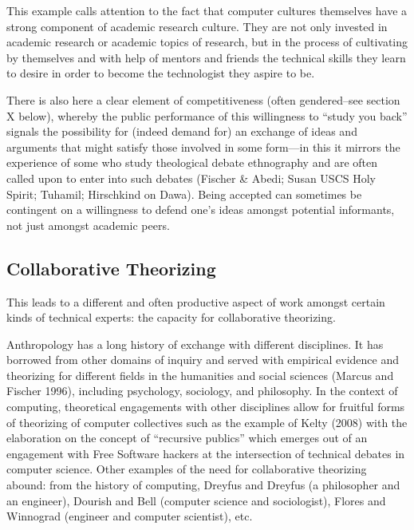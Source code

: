 \documentclass[10pt,letter,oneside]{scrartcl}
\begin{document}
This example calls attention to the fact that computer cultures
themselves have a strong component of academic research culture. They
are not only invested in academic research or academic topics of
research, but in the process of cultivating by themselves and with
help of mentors and friends the technical skills they learn to desire
in order to become the technologist they aspire to be. 

There is also here a clear element of competitiveness (often
gendered--see section X below), whereby the public performance of this
willingness to ``study you back'' signals the possibility for (indeed
demand for) an exchange of ideas and arguments that might satisfy
those involved in some form---in this it mirrors the experience of
some who study theological debate ethnography and are often called
upon to enter into such debates (Fischer \& Abedi; Susan USCS Holy
Spirit; Tuhamil; Hirschkind on Dawa).  Being accepted can sometimes be
contingent on a willingness to defend one's ideas amongst potential
informants, not just amongst academic peers.

\subsection{Collaborative Theorizing} 

This leads to a different and often productive aspect of work amongst
certain kinds of technical experts: the capacity for collaborative
theorizing.  



Anthropology has a long history of exchange with
different disciplines. It has borrowed from other domains of inquiry
and served with empirical evidence and theorizing for different fields
in the humanities and social sciences (Marcus and Fischer 1996),
including psychology, sociology, and philosophy.  In the context of
computing, theoretical engagements with other disciplines allow for
fruitful forms of theorizing of computer collectives such as the
example of Kelty (2008) with the elaboration on the concept of
``recursive publics'' which emerges out of an engagement with Free
Software hackers at the intersection of technical debates in computer
science. Other examples of the need for collaborative theorizing
abound: from the history of computing, Dreyfus and Dreyfus (a
philosopher and an engineer), Dourish and Bell (computer science and
sociologist), Flores and Winnograd (engineer and computer scientist),
etc.
\end{document}
